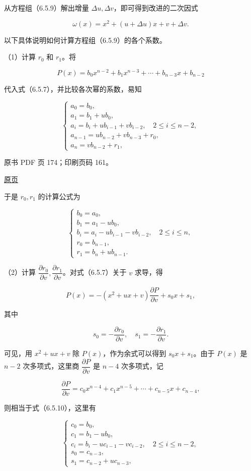 从方程组（6.5.9）解出增量 \(\Delta u,\Delta v\)，即可得到改进的二次因式

\[
\omega(x)=x^2+(u+\Delta u)x+v+\Delta v.
\]

以下具体说明如何计算方程组（6.5.9）的各个系数。

（1）计算 \(r_0\) 和 \(r_1\)。将

\[
P(x)=b_0x^{n-2}+b_1x^{n-3}+\cdots+b_{n-3}x+b_{n-2}
\]

代入式（6.5.7），并比较各次幂的系数，易知

\[
\begin{cases}
a_0=b_0,\\
a_1=b_1+ub_0,\\
a_i=b_i+ub_{i-1}+vb_{i-2},\quad2\leqslant i\leqslant n-2,\\
a_{n-1}=ub_{n-2}+vb_{n-3}+r_0,\\
a_n=vb_{n-2}+r_1,
\end{cases}
\]

\clearpage

原书 PDF 页 174；印刷页码 161。

\href{source-images/pdf-174.jpeg}{原页}

于是 \(r_0,r_1\) 的计算公式为

\[
\begin{cases}
b_0=a_0,\\
b_1=a_1-ub_0,\\
b_i=a_i-ub_{i-1}-vb_{i-2},\quad2\leqslant i\leqslant n,\\
r_0=b_{n-1},\\
r_1=b_n+ub_{n-1}.
\end{cases}
\tag{6.5.10}
\]

（2）计算 \(\dfrac{\partial r_0}{\partial v},\dfrac{\partial r_1}{\partial v}\)。对式（6.5.7）关于 \(v\) 求导，得

\[
P(x)=-(x^2+ux+v)\frac{\partial P}{\partial v}+s_0x+s_1,
\tag{6.5.11}
\]

其中

\[
s_0=-\frac{\partial r_0}{\partial v},\quad s_1=-\frac{\partial r_1}{\partial v}.
\tag{6.5.12}
\]

可见，用 \(x^2+ux+v\) 除 \(P(x)\)，作为余式可以得到 \(s_0x+s_1\)。由于 \(P(x)\) 是 \(n-2\) 次多项式，这里商 \(\dfrac{\partial P}{\partial v}\) 是 \(n-4\) 次多项式，记

\[
\frac{\partial P}{\partial v}=c_0x^{n-4}+c_1x^{n-5}+\cdots+c_{n-5}x+c_{n-4},
\]

则相当于式（6.5.10），这里有

\[
\begin{cases}
c_0=b_0,\\
c_1=b_1-ub_0,\\
c_i=b_i-uc_{i-1}-vc_{i-2},\quad2\leqslant i\leqslant n-2,\\
s_0=c_{n-3},\\
s_1=c_{n-2}+uc_{n-3},
\end{cases}
\]

